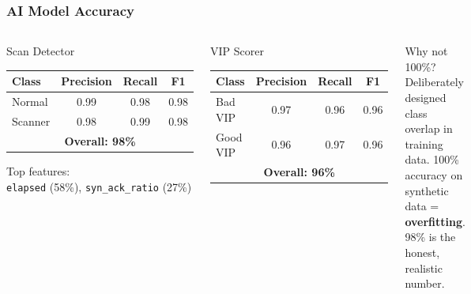 \documentclass{beamer}
\begin{document}
\begin{frame}
\frametitle{AI Model Accuracy}

\begin{columns}

\begin{block}{Scan Detector}
\begin{tabular}{lccc}
\toprule
Class & Precision & Recall & F1 \\
\midrule
Normal  & 0.99 & 0.98 & 0.98 \\
Scanner & 0.98 & 0.99 & 0.98 \\
\midrule
\multicolumn{4}{c}{\textbf{Overall: 98\%}} \\
\bottomrule
\end{tabular}
\vspace{4pt}

Top features:\\
\texttt{elapsed} (58\%), \texttt{syn\_ack\_ratio} (27\%)
\end{block}

\begin{block}{VIP Scorer}
\begin{tabular}{lccc}
\toprule
Class    & Precision & Recall & F1 \\
\midrule
Bad VIP  & 0.97 & 0.96 & 0.96 \\
Good VIP & 0.96 & 0.97 & 0.96 \\
\midrule
\multicolumn{4}{c}{\textbf{Overall: 96\%}} \\
\bottomrule
\end{tabular}
\end{block}

\begin{alertblock}{Why not 100\%?}
Deliberately designed class overlap in training data.
100\% accuracy on synthetic data = \textbf{overfitting}.
98\% is the honest, realistic number.
\end{alertblock}

\end{columns}

\end{frame}
\end{document}
